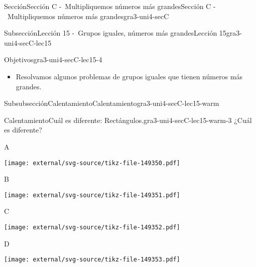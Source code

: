 \documentclass[twoside,14pt,]{extarticle}
\begin{document}
\begin{sectionptx}{Sección}{Sección C -~Multipliquemos números más grandes}{}{Sección C -~Multipliquemos números más grandes}{}{}{gra3-uni4-secC}
%
%
\typeout{************************************************}
\typeout{************************************************}
%
\begin{subsectionptx}{Subsección}{Lección 15 -~Grupos iguales, números más grandes}{}{Lección 15}{}{}{gra3-uni4-secC-lec15}
\begin{objectives}{Objetivos}{gra3-uni4-secC-lec15-4}
%
\begin{itemize}[label=\textbullet]
\item{}Resolvamos algunos problemas de grupos iguales que tienen números más grandes.%
\end{itemize}
\end{objectives}
%
%
\typeout{************************************************}
\typeout{************************************************}
%
\begin{subsubsectionptx}{Subsubsección}{Calentamiento}{}{Calentamiento}{}{}{gra3-uni4-secC-lec15-warm}
\begin{exploration}{Calentamiento}{Cuál es diferente: Rectángulos.}{gra3-uni4-secC-lec15-warm-3}%
¿Cuál es diferente?%
\begin{sidebyside}{2}{0}{0}{0}%
\begin{sbspanel}{0.5}%
A%
\par
\texttt{[image: external/svg-source/tikz-file-149350.pdf]}
\end{sbspanel}%
\begin{sbspanel}{0.5}%
B%
\par
\texttt{[image: external/svg-source/tikz-file-149351.pdf]}
\end{sbspanel}%
\end{sidebyside}%
\begin{sidebyside}{2}{0}{0}{0}%
\begin{sbspanel}{0.5}%
C%
\par
\texttt{[image: external/svg-source/tikz-file-149352.pdf]}
\end{sbspanel}%
\begin{sbspanel}{0.5}%
D%
\par
\texttt{[image: external/svg-source/tikz-file-149353.pdf]}
\end{sbspanel}%
\end{sidebyside}%
\end{exploration}%

\end{subsubsectionptx}
\end{subsectionptx}
\end{sectionptx}
\end{document}
